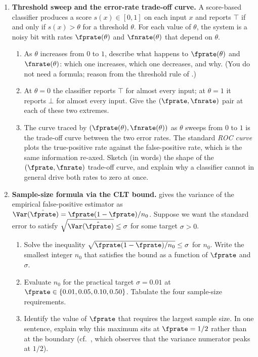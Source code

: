 \begin{enumerate}
\item \exstarstarstar
\label{ex:ch1-7}
\textbf{Threshold sweep and the error-rate trade-off curve.}
A score-based classifier produces a score $s(x) \in [0, 1]$ on each
input $x$ and reports $\top$ if and only if $s(x) > \theta$ for a
threshold $\theta$. For each value of $\theta$, the system is a noisy
bit with rates $\fprate(\theta)$ and $\fnrate(\theta)$ that depend on
$\theta$.
\begin{enumerate}
  \item[(a)] As $\theta$ increases from $0$ to $1$, describe what
    happens to $\fprate(\theta)$ and $\fnrate(\theta)$: which one
    increases, which one decreases, and why. (You do not need a
    formula; reason from the threshold rule of .)
  \item[(b)] At $\theta = 0$ the classifier reports $\top$ for almost
    every input; at $\theta = 1$ it reports $\bot$ for almost every
    input. Give the $(\fprate, \fnrate)$ pair at each of these two
    extremes.
  \item[(c)] The curve traced by $(\fprate(\theta), \fnrate(\theta))$
    as $\theta$ sweeps from $0$ to $1$ is the trade-off curve between
    the two error rates. The standard \emph{ROC curve} plots the
    true-positive rate against the false-positive rate, which is the
    same information re-axed. Sketch (in words) the shape of the
    $(\fprate, \fnrate)$ trade-off curve, and explain why a classifier
    cannot in general drive both rates to zero at once.
\end{enumerate}

\item \exstarstar
\label{ex:ch1-8}
\textbf{Sample-size formula via the CLT bound.}
 gives the variance of the empirical
false-positive estimator as $\Var(\hat{\fprate}) = \fprate(1 - \fprate)/n_0$.
Suppose we want the standard error to satisfy $\sqrt{\Var(\hat{\fprate})}
\le \sigma$ for some target $\sigma > 0$.
\begin{enumerate}
  \item[(a)] Solve the inequality $\sqrt{\fprate(1 - \fprate)/n_0} \le
    \sigma$ for $n_0$. Write the smallest integer $n_0$ that satisfies
    the bound as a function of $\fprate$ and $\sigma$.
  \item[(b)] Evaluate $n_0$ for the practical target $\sigma = 0.01$ at
    $\fprate \in \{0.01, 0.05, 0.10, 0.50\}$. Tabulate the four
    sample-size requirements.
  \item[(c)] Identify the value of $\fprate$ that requires the largest
    sample size. In one sentence, explain why this maximum sits at
    $\fprate = 1/2$ rather than at the boundary (cf.\
    , which observes that the variance numerator
    peaks at $1/2$).
\end{enumerate}


\end{enumerate}
